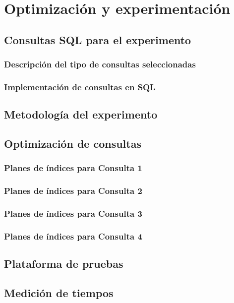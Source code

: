 \section{Optimización y experimentación}
\subsection{Consultas SQL para el experimento}
\subsubsection{Descripción del tipo de consultas seleccionadas}
\subsubsection{Implementación de consultas en SQL}

\subsection{Metodología del experimento}

\subsection{Optimización de consultas}
\subsubsection{Planes de índices para Consulta 1}
\subsubsection{Planes de índices para Consulta 2}
\subsubsection{Planes de índices para Consulta 3}
\subsubsection{Planes de índices para Consulta 4}

\subsection{Plataforma de pruebas}

\subsection{Medición de tiempos}
